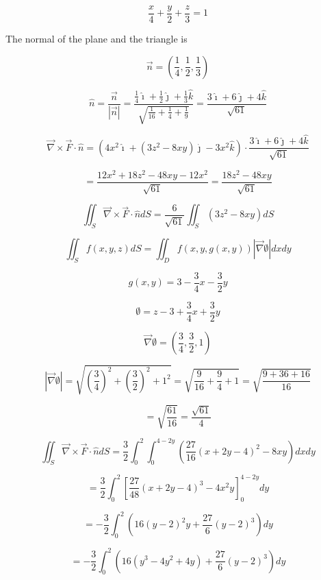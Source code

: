 \documentclass[12pt]{article}
\begin{document}
\[
    \frac{x}{4} + \frac{y}{2} + \frac{z}{3} = 1
\]

The normal of the plane and the triangle is

\[
    \vec{n} = \left( \frac{1}{4}, \frac{1}{2}, \frac{1}{3} \right)
\]

\[
    \hat{n} = \frac{\vec{n}}{\left| \vec{n} \right|}
    = \frac{\frac{1}{4} \hat{\imath} + \frac{1}{2} \hat{\jmath} + \frac{1}{3} \hat{k}}{\sqrt{\frac{1}{16} + \frac{1}{4} + \frac{1}{9}}}
    = \frac{3 \hat{\imath} + 6 \hat{\jmath} + 4 \hat{k}}{\sqrt{61}}
\]

\[
    \vec{\nabla} \times \vec{F} \cdot \hat{n}
    = \left(
    4 x^2 \hat{\imath}
    + \left(3 z^2 - 8 x y\right) \hat{\jmath}
    - 3 x^2 \hat{k}
    \right) \cdot
    \frac{3 \hat{\imath} + 6 \hat{\jmath} + 4 \hat{k}}{\sqrt{61}}
\]

\[
    = \frac{12 x^2 + 18 z^2 - 48 x y - 12 x^2}{\sqrt{61}}
    = \frac{18 z^2 - 48 x y}{\sqrt{61}}
\]

\[
    \iint_S \vec{\nabla} \times \vec{F} \cdot \hat{n} d S
    = \frac{6}{\sqrt{61}} \iint_S \left(3 z^2 - 8 x y\right)  d S
\]

\[
    \iint_S f(x, y, z) d S= \iint_D f(x, y, g(x, y))|\vec{\nabla} \emptyset| d x d y
\]

\[
    g(x, y) = 3 - \frac{3}{4} x - \frac{3}{2} y
\]

\[
    \emptyset = z - 3 + \frac{3}{4} x + \frac{3}{2} y
\]

\[
    \vec{\nabla} \emptyset = \left( \frac{3}{4}, \frac{3}{2}, 1 \right)
\]

\[
    |\vec{\nabla} \emptyset| = \sqrt{{\left( \frac{3}{4} \right)}^2 + {\left( \frac{3}{2} \right)}^2 + 1^2}
    = \sqrt{\frac{9}{16} + \frac{9}{4} + 1}
    = \sqrt{\frac{9 + 36 + 16}{16}}
\]

\[
    = \sqrt{\frac{61}{16}}
    = \frac{\sqrt{61}}{4}
\]

\[
    \iint_S \vec{\nabla} \times \vec{F} \cdot \hat{n} d S
    = \frac{3}{2} \int_0^2 \int_0^{4-2y} \left(\frac{27}{16} {\left(x + 2y - 4\right)}^2 - 8 x y\right)  dx dy
\]


\[
    = \frac{3}{2} \int_0^2 {\left[\frac{27}{48} {\left(x + 2y - 4\right)}^3 - 4 x^2 y\right]}_0^{4-2y} dy
\]

\[
    = - \frac{3}{2} \int_0^2 {\left(16 {\left(y-2\right)}^2 y + \frac{27}{6} {\left(y - 2\right)}^3\right) } dy
\]

\[
    = - \frac{3}{2} \int_0^2 {\left(16 \left(y^3-4y^2+4y\right) + \frac{27}{6} {\left(y - 2\right)}^3\right) } dy
\]
\end{document}
